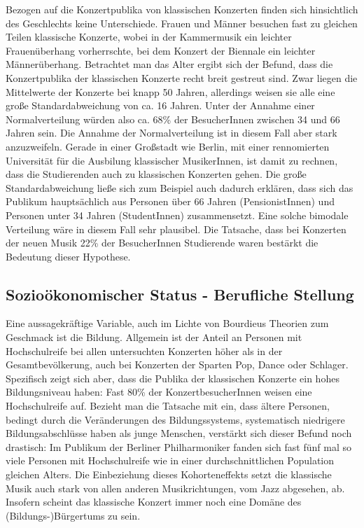 \documentclass[a4paper, german, oneside]{scrbook}
\begin{document}
Bezogen auf die Konzertpublika von klassischen Konzerten finden sich hinsichtlich des Geschlechts keine Unterschiede. Frauen und Männer besuchen fast zu gleichen Teilen klassische Konzerte, wobei in der Kammermusik ein leichter Frauenüberhang vorherrschte, bei dem Konzert der Biennale ein leichter Männerüberhang. \parencite[vgl.][484]{de_la_motte-haber_konzertpublika_2007} Betrachtet man das Alter ergibt sich der Befund, dass die Konzertpublika der klassischen Konzerte recht breit gestreut sind. Zwar liegen die Mittelwerte der Konzerte bei knapp 50 Jahren, allerdings weisen sie alle eine große Standardabweichung von ca. 16 Jahren. Unter der Annahme einer Normalverteilung würden also ca. 68\% der BesucherInnen zwischen 34 und 66 Jahren sein. \parencite[vgl.][480]{de_la_motte-haber_konzertpublika_2007} Die Annahme der Normalverteilung ist in diesem Fall aber stark anzuzweifeln. Gerade in einer Großstadt wie Berlin, mit einer rennomierten Universität für die Ausbilung klassischer MusikerInnen, ist damit zu rechnen, dass die Studierenden auch zu klassischen Konzerten gehen. Die große Standardabweichung ließe sich zum Beispiel auch dadurch erklären, dass sich das Publikum hauptsächlich aus Personen über 66 Jahren (PensionistInnen) und Personen unter 34 Jahren (StudentInnen) zusammensetzt. Eine solche bimodale Verteilung wäre in diesem Fall sehr plausibel. Die Tatsache, dass bei Konzerten der neuen Musik 22\% der BesucherInnen Studierende waren bestärkt die Bedeutung dieser Hypothese. \parencite[vgl.][486]{de_la_motte-haber_konzertpublika_2007}

\subsection{Sozioökonomischer Status - Berufliche Stellung}
Eine aussagekräftige Variable, auch im Lichte von Bourdieus Theorien zum Geschmack ist die Bildung. Allgemein ist der Anteil an Personen mit Hochschulreife bei allen untersuchten Konzerten höher als in der Gesamtbevölkerung, auch bei Konzerten der Sparten Pop, Dance oder Schlager. Spezifisch zeigt sich aber, dass die Publika der klassischen Konzerte ein hohes Bildungsniveau haben: Fast 80\% der KonzertbesucherInnen weisen eine Hochschulreife auf. Bezieht man die Tatsache mit ein, dass ältere Personen, bedingt durch die Veränderungen des Bildungssystems, systematisch niedrigere Bildungsabschlüsse haben als junge Menschen, verstärkt sich dieser Befund noch drastisch: Im Publikum der Berliner Philharmoniker fanden sich fast fünf mal so viele Personen mit Hochschulreife wie in einer durchschnittlichen Population gleichen Alters. Die Einbeziehung dieses Kohorteneffekts setzt die klassische Musik auch stark von allen anderen Musikrichtungen, vom Jazz abgesehen, ab. Insofern scheint das klassische Konzert immer noch eine Domäne des (Bildungs-)Bürgertums zu sein. \parencite[vgl.][482]{de_la_motte-haber_konzertpublika_2007}
\end{document}
